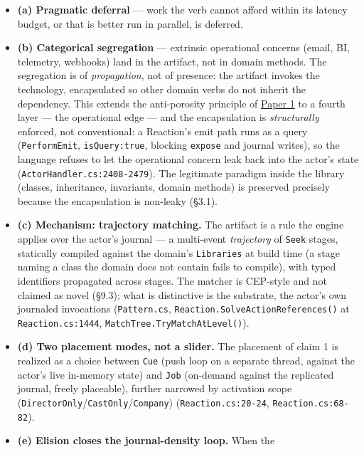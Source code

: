 \documentclass[
]{article}
\providecommand{\tightlist}{%
  \setlength{\itemsep}{0pt}\setlength{\parskip}{0pt}}
\let\origtexttt\texttt%
\renewcommand{\texttt}[1]{\origtexttt{\seqsplit{#1}}}%
\let\texttt\origtexttt%
\begin{document}
\begin{enumerate}
  \begin{itemize}
  \tightlist
  \item
    \textbf{(a) Pragmatic deferral} --- work the verb cannot afford
    within its latency budget, or that is better run in parallel, is
    deferred.
  \item
    \textbf{(b) Categorical segregation} --- extrinsic operational
    concerns (email, BI, telemetry, webhooks) land in the artifact, not
    in domain methods. The segregation is of \emph{propagation}, not of
    presence: the artifact invokes the technology, encapsulated so other
    domain verbs do not inherit the dependency. This extends the
    anti-porosity principle of \href{01-anti-porosity.md}{Paper 1} to a
    fourth layer --- the operational edge --- and the encapsulation is
    \emph{structurally} enforced, not conventional: a Reaction's emit
    path runs as a query (\texttt{PerformEmit}, \texttt{isQuery:true},
    blocking \texttt{expose} and journal writes), so the language
    refuses to let the operational concern leak back into the actor's
    state (\texttt{ActorHandler.cs:2408-2479}). The legitimate paradigm
    inside the library (classes, inheritance, invariants, domain
    methods) is preserved precisely because the encapsulation is
    non-leaky (§3.1).
  \item
    \textbf{(c) Mechanism: trajectory matching.} The artifact is a rule
    the engine applies over the actor's journal --- a multi-event
    \emph{trajectory} of \texttt{Seek} stages, statically compiled
    against the domain's \texttt{Libraries} at build time (a stage
    naming a class the domain does not contain fails to compile), with
    typed identifiers propagated across stages. The matcher is CEP-style
    and not claimed as novel (§9.3); what is distinctive is the
    substrate, the actor's own journaled invocations
    (\texttt{Pattern.cs}, \texttt{Reaction.SolveActionReferences()} at
    \texttt{Reaction.cs:1444}, \texttt{MatchTree.TryMatchAtLevel()}).
  \item
    \textbf{(d) Two placement modes, not a slider.} The placement of
    claim 1 is realized as a choice between \texttt{Cue} (push loop on a
    separate thread, against the actor's live in-memory state) and
    \texttt{Job} (on-demand against the replicated journal, freely
    placeable), further narrowed by activation scope
    (\texttt{DirectorOnly}/\texttt{CastOnly}/\texttt{Company})
    (\texttt{Reaction.cs:20-24}, \texttt{Reaction.cs:68-82}).
  \item
    \textbf{(e) Elision closes the journal-density loop.} When the

\end{itemize}
\end{enumerate}
\end{document}
